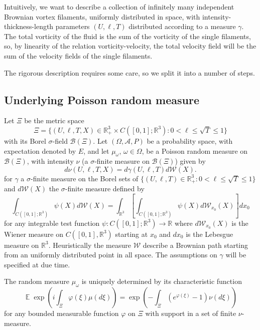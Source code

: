 \documentclass[a4paper,12pt]{article}
\DeclareMathOperator{\expect}{{\mathbb E}}
\begin{document}
Intuitively, we want to describe a collection of infinitely many independent
Brownian vortex filaments, uniformly distributed in space, with
intensity-thickness-length parameters $(U,\ell,T)$ distributed according to a
measure $\gamma$. The total vorticity of the fluid is the sum of the vorticity
of the single filaments, so, by linearity of the relation vorticity-velocity,
the total velocity field will be the sum of the velocity fields of the single filaments.

The rigorous description requires some care, so we split it into a number of steps.

\subsection{Underlying Poisson random measure}

Let $\Xi$ be the metric space
\[
\Xi=\{(U,\ell,T,X)\in\mathbb{R}_{+}^{3}\times C([0,1];\mathbb{R}^{3}%
):0<\ell\leq\sqrt{T}\leq1\}
\]
with its Borel $\sigma$-field $\mathcal{B}\left(  \Xi\right)  $. Let $\left(
\Omega,\mathcal{A},P\right)  $ be a probability space, with expectation
denoted by $E$, and let $\mu_{\omega}$, $\omega\in\Omega$, be a Poisson random
measure on $\mathcal{B}\left(  \Xi\right)  $, with intensity $\nu$ (a $\sigma
$-finite measure on $\mathcal{B}\left(  \Xi\right)  $) given by
\[
d\nu(U,\ell,T,X)=d\gamma(U,\ell,T)d\mathcal{W}(X).
\]
for $\gamma$ a $\sigma$-finite measure on the Borel sets of $\{(U,\ell
,T)\in\mathbb{R}_{+}^{3}:0<\ell\leq\sqrt{T}\leq1\}$ and $d\mathcal{W}(X)$ the
$\sigma$-finite measure defined by
\[
\int_{C([0,1];\mathbb{R}^{3})} \psi(X) d\mathcal{W}(X) = \int_{\mathbb{R}^{3}}
\left[  \int_{C([0,1];\mathbb{R}^{3})} \psi(X) d\mathcal{W}_{x_{0}}(X)\right]
dx_{0}%
\]
for any integrable test function $\psi: C([0,1];\mathbb{R}^{3}) \to\mathbb{R}$
where $d\mathcal{W}_{x_{0}}(X)$ is the Wiener measure on $C([0,1],\mathbb{R}%
^{3})$ starting at $x_{0}$ and $dx_{0}$ is the Lebesgue measure on
$\mathbb{R}^{3}$. Heuristically the measure $\mathcal{W}$ describe a Brownian
path starting from an uniformly distributed point in all space. The
assumptions on $\gamma$ will be specified at due time.

The random measure $\mu_{\omega}$ is uniquely determined by its characteristic
function
\[
\expect\exp\left(  i\int_{\Xi}\varphi(\xi)\mu(d\xi)\right)  =\exp\left(
-\int_{\Xi}(e^{\varphi(\xi)}-1)\nu(d\xi)\right)
\]
for any bounded measurable function $\varphi$ on $\Xi$ with support in a set
of finite $\nu$-measure.
\end{document}
